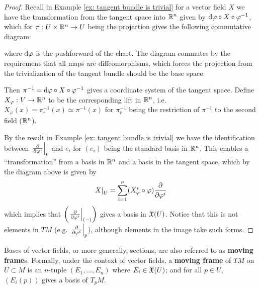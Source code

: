 \documentclass{article}
\begin{document}
\begin{proof}
    Recall in Example \ref{ex: tangent bundle is trivial} for a vector field $X$ we have the transformation from the tangent space into $\mathbb{R}^n$ given by $\mathrm{d}\varphi \circ X \circ \varphi^{-1}$, which for $\pi: U \times \mathbb{R}^n \to U$ being the projection gives the following commutative diagram:

    \begin{minipage}{\linewidth}
        \centering
    \end{minipage}

    where $\mathrm{d}\varphi$ is the pushforward of the chart. The diagram commutes by the requirement that all maps are diffeomorphisms, which forces the projection from the trivialization of the tangent bundle should be the base space.
    
    Then $\pi^{-1} = \mathrm{d}\varphi \circ X \circ \varphi^{-1}$ gives a coordinate system of the tangent space. Define $X_{\varphi}: V \to \mathbb{R}^n$ to be the corresponding lift in $\mathbb{R}^n$, i.e. $X_{\varphi}(x) = \pi_r^{-1}(x) \simeq \pi^{-1}(x)$ for $\pi_r^{-1}$ being the restriction of $\pi^{-1}$ to the second field ($\mathbb{R}^n$). 

    By the result in Example \ref{ex: tangent bundle is trivial} we have the identification between $\left.\frac{\partial}{\partial \varphi^i}\right|_{p}$ and $e_i$ for $(e_i)$ being the standard basis in $\mathbb{R}^n$. This enables a ``transformation'' from a basis in $\mathbb{R}^n$ and a basis in the tangent space, which by the diagram above is given by
    \[
        \left.X\right|_{U} = \sum_{i = 1}^{n} (X_{\varphi}^i \circ \varphi) \frac{\partial}{\partial \varphi^i}
    \]
    which implies that $\left(\left.\frac{\partial}{\partial \varphi^i}\right|_{(-)}\right)$ gives a basis in $\mathfrak{X}(U)$. Notice that this is not elements in $TM$ (e.g. $\left.\frac{\partial}{\partial \varphi^i}\right|_{p}$), although elements in the image take such forms. 
\end{proof}

\begin{definition}
    Bases of vector fields, or more generally, sections, are also referred to as \textbf{moving frame}s. Formally, under the context of vector fields, a \textbf{moving frame} of $TM$ on $U \subset M$ is an $n$-tuple $(E_1, \dots, E_n)$ where $E_i \in \mathfrak{X}(U)$; and for all $p \in U$, $(E_i(p))$ gives a basis of $T_p M$. 
\end{definition}
\end{document}
